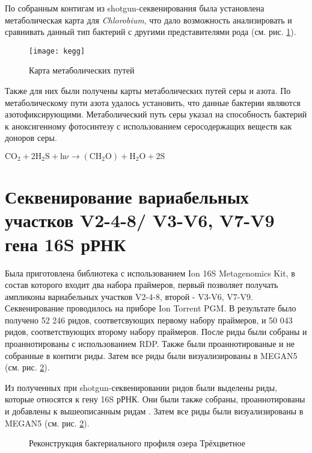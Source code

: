 По собранным контигам из shotgun-секвенирования была установлена метаболическая карта для \textit{Chlorobium}, что дало возможность анализировать и сравнивать данный тип бактерий с другими представителями рода (см. рис. \ref{img:kegg}). 

\begin{landscape}
\begin{figure}[h]
  \texttt{[image: kegg]}
  \centering
  \caption{Карта метаболических путей}
  \label{img:kegg}  
\end{figure}
\end{landscape}

Также для них были получены карты метаболических путей серы и азота. По метаболическому пути азота удалось установить, что данные бактерии являются азотофиксирующими. Метаболический путь серы указал на способность бактерий к аноксигенному фотосинтезу с использованием серосодержащих веществ как доноров серы. 

\begin{center}
$\mathrm{C O_2 + 2H_2 S + h\nu \xrightarrow{} (C H_2 O) + H_2 O + 2 S}$
\end{center} 

\section{Секвенирование вариабельных участков V2-4-8/ V3-V6, V7-V9 гена 16S рРНК} \label{sect2_2}

Была приготовлена библиотека с использованием  Ion 16S Metagenomics Kit, в состав которого входит два набора праймеров, первый позволяет получать ампликоны вариабельных участков V2-4-8, второй - V3-V6, V7-V9. Секвенирование проводилось на приборе Ion Torrent PGM. В результате было получено 52 246 ридов, соответсвующих первому набору праймеров, и 50 043 ридов, соответствующих второму набору праймеров. После риды были собраны и проаннотированы с использованием RDP. Также были проаннотированые и не собранные в контиги риды. Затем все риды были визуализированы в MEGAN5 (см. рис. \ref{ris:sg+16S}). 

Из полученных при shotgun-секвенировании ридов были выделены риды, которые относятся к гену 16S рРНК. Они были также собраны, проаннотированы и добавлены к вышеописанным ридам . Затем все риды были визуализированы в MEGAN5 (см. рис. \ref{ris:sg+16S}). 

\begin{figure}[h]
\begin{minipage}[h]{0.6\linewidth}
\center{\texttt{[image: sg+16S]} \\ }
\end{minipage}
\hfill
\begin{minipage}[h]{0.5\linewidth}
\end{minipage}
\caption{Реконструкция бактериального профиля озера Трёхцветное}
\label{ris:sg+16S}
\end{figure}

